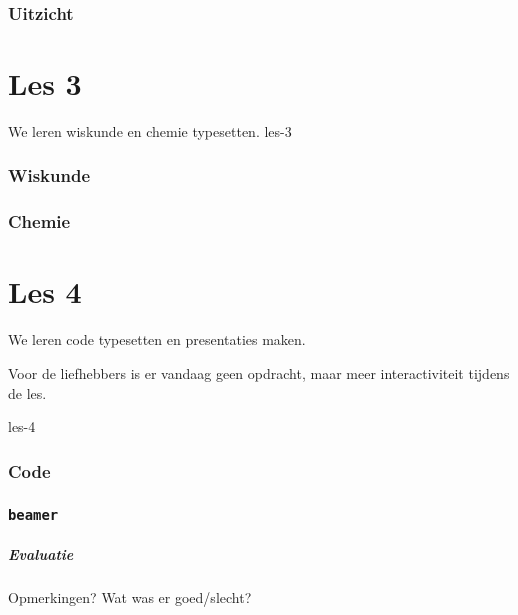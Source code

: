 \documentclass{beamer}
\begin{document}
\section{Uitzicht}



\part{Les 3}
\lecture
{We leren wiskunde en chemie typesetten.}
{les-3}
\section{Wiskunde}

\section{Chemie}



\part{Les 4}
\lecture
{We leren code typesetten en presentaties maken.

Voor de liefhebbers is er vandaag geen opdracht, maar meer interactiviteit tijdens de les.}
{les-4}
\section{Code}

\section{\texttt{beamer}}


\begin{frame}
  \frametitle{Evaluatie}

  Opmerkingen? Wat was er goed/slecht?
\end{frame}
\end{document}
